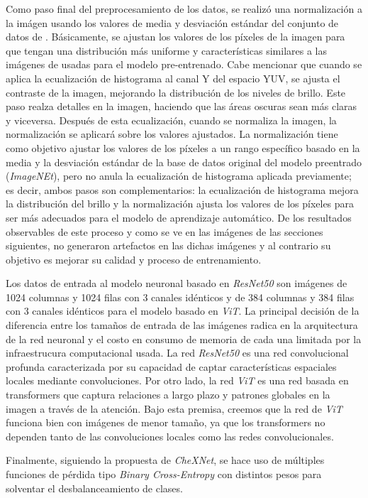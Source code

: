 Como paso final del preprocesamiento de los datos, se realizó una normalización a la imágen usando los valores de
media y desviación estándar del conjunto
de datos de . Básicamente, se ajustan los valores de los píxeles de la imagen para que tengan una
distribución más uniforme y características similares a las imágenes de usadas para el modelo pre-entrenado.
Cabe mencionar que cuando se aplica la ecualización de histograma al canal Y del espacio YUV, se ajusta el contraste de
la imagen, mejorando la distribución de los niveles de brillo. Este paso realza detalles en la imagen, haciendo que las
áreas oscuras sean más claras y viceversa. Después de esta ecualización, cuando se normaliza la imagen, la normalización
se aplicará sobre los valores ajustados. La normalización tiene como objetivo ajustar los valores de los píxeles a un
rango específico basado en la media y la desviación estándar de la base de datos original del modelo preentrado
(\textit{ImageNEt}), pero no anula la ecualización de histograma aplicada previamente; es decir, ambos pasos son
complementarios: la ecualización de histograma mejora la distribución del brillo y la normalización ajusta los valores
de los píxeles para ser más adecuados para el modelo de aprendizaje automático. De los resultados observables de este
proceso y como se ve en las imágenes de las secciones siguientes, no generaron artefactos en las dichas imágenes y al
contrario su objetivo es mejorar su calidad y proceso de entrenamiento.

Los datos de entrada al modelo neuronal basado en \textit{ResNet50} son imágenes de 1024 columnas y 1024 filas con 3
canales idénticos y de 384 columnas y 384 filas con 3 canales idénticos para el modelo basado en \textit{ViT}.
La principal decisión de la diferencia entre los tamaños de entrada de las imágenes radica en la arquitectura de la red
neuronal y el costo en consumo de memoria de cada una limitada por la infraestrucura computacional usada.
La red \textit{ResNet50} es una red convolucional profunda caracterizada por su capacidad de captar características
espaciales locales mediante convoluciones. Por otro lado, la red \textit{ViT} es una red basada en transformers que
captura relaciones a largo plazo y patrones globales en la imagen a través de la atención. Bajo esta premisa, creemos
que la red de \textit{ViT} funciona bien con imágenes de menor tamaño, ya que los transformers no dependen tanto de las
convoluciones locales como las redes convolucionales.

Finalmente, siguiendo la propuesta de \textit{CheXNet}, se hace uso de múltiples funciones de pérdida tipo
\textit{Binary Cross-Entropy} con distintos pesos para solventar el desbalanceamiento de clases.



